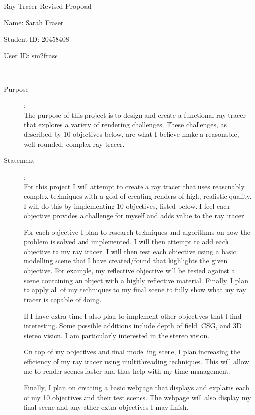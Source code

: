 \documentclass {article}
\begin{document}
~\vfill
\begin{center}
\Large

Ray Tracer Revised Proposal

Name: Sarah Fraser

Student ID: 20458408

User ID: sm2frase
\end{center}
\vfill ~\vfill~
\newpage
{}
\begin{description}
\item[Purpose]:\\
	The purpose of this project is to design and create a functional ray tracer that explores a variety of rendering challenges. These challenges, as described by 10 objectives below, are what I believe make a reasonable, well-rounded, complex ray tracer.

\item[Statement]:\\
	For this project I will attempt to create a ray tracer that uses reasonably complex techniques with a goal of creating renders of high, realistic quality. I will do this by implementing 10 objectives, listed below. I feel each objective provides a challenge for myself and adds value to the ray tracer.
	
	For each objective I plan to research techniques and algorithms on how the problem is solved and implemented. I will then attempt to add each objective to my ray tracer. I will then test each objective using a basic modelling scene that I have created/found that highlights the given objective. For example, my reflective objective will be tested against a scene containing an object with a highly reflective material. Finally, I plan to apply all of my techniques to my final scene to fully show what my ray tracer is capable of doing.
	
	If I have extra time I also plan to implement other objectives that I find interesting. Some possible additions include depth of field, CSG, and 3D stereo vision. I am particularly interested in the stereo vision.
	
	On top of my objectives and final modelling scene, I plan increasing the efficiency of my ray tracer using multithreading techniques. This will allow me to render scenes faster and thus help with my time management.
	
	Finally, I plan on creating a basic webpage that displays and explains each of my 10 objectives and their test scenes. The webpage will also display my final scene and any other extra objectives I may finish.
	

\end{description}
\end{document}
